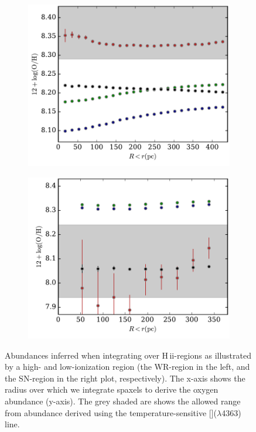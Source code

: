 \documentclass[traditabstract]{aa}
\newcommand{\hii}{\mbox{H\,{\sc ii}}}
\newcommand{\oiii}{[\ion{O}{iii}]}
\begin{document}
\begin{appendix}
\begin{figure}
\begin{subfigure}{.24\textwidth}
  \includegraphics[width=0.999\linewidth]{Figs/OHrad.pdf}
\end{subfigure}
\begin{subfigure}{.24\textwidth}
  \includegraphics[width=0.999\linewidth]{Figs/OHrad2.pdf}
\end{subfigure}\caption{Abundances inferred when integrating over \hii-regions as illustrated by a high- and low-ionization region (the WR-region in the left, and the SN-region in the right plot, respectively). The x-axis shows the radius over which we integrate spaxels to derive the oxygen abundance (y-axis). The grey shaded are shows the allowed range from abundance derived using the temperature-sensitive \oiii($\lambda$4363) line.}
\label{fig:UO3}
\end{figure}


\end{appendix}
\end{document}

